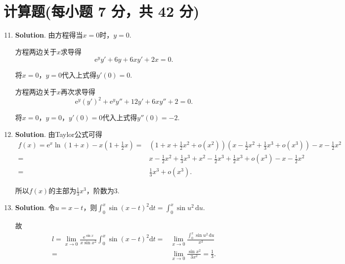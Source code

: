 \documentclass[../Main.tex]{subfiles}
\begin{document}
\section{计算题(每小题 7 分，共 42 分)}
\begin{enumerate}
    \setcounter{enumi}{10}
    \item \textbf{Solution}. 由方程得当$x=0$时，$y=0$.

          方程两边关于$x$求导得
          \[
              \mathrm{e}^{y}y'+6y+6xy'+2x=0.
          \]

          将$x=0$，$y=0$代入上式得$y'(0)=0$.

          方程两边关于$x$再次求导得
          \[
              \mathrm{e}^{y}(y')^{2}+\mathrm{e}^{y}y''+12y'+6xy''+2=0.
          \]

          将$x=0$，$y=0$，$y'(0)=0$代入上式得$y''(0)=-2$.

    \item \textbf{Solution}. 由Taylor公式可得
          \[
              \begin{aligned}
                  f(x)=\mathrm{e}^{x}\ln(1+x)-x\left(1+\frac{1}{2}x\right) = & \left(1+x+\frac{1}{2}x^{2}+o(x^{2})\right)\left(x-\frac{1}{2}x^{2}+\frac{1}{3}x^{3}+o(x^{3})\right)-x-\frac{1}{2}x^{2} \\
                  =                                                          & x-\frac{1}{2}x^{2}+\frac{1}{3}x^{3}+x^{2}-\frac{1}{2}x^{3}+\frac{1}{2}x^{3}+o(x^{3})-x-\frac{1}{2}x^{2}                \\
                  =                                                          & \frac{1}{3}x^{3}+o(x^{3}).
              \end{aligned}
          \]

          所以$f(x)$的主部为$\frac{1}{3}x^{3}$，阶数为$3$.

    \item \textbf{Solution}. 令$u=x-t$，则$\int_{0}^{x}\sin(x-t)^{2} \mathrm{d}
              t = \int_{0}^{x}\sin u^{2}\,\mathrm{d}u$.

          故
          \[
              \begin{aligned}
                  l = \lim_{x\to0}\frac{\mathrm{e}^{\sin x}}{x\sin x^2}\int_{0}^{x}\sin(x-t)^{2} \mathrm{d}t = & \lim_{x\to0}\frac{\displaystyle\int_{0}^{x}\sin u^2\,\mathrm{d}u}{x^3} \\
                  =                                                                                            & \lim_{x\to0}\frac{\sin x^2}{3x^2}= \frac{1}{3}.
              \end{aligned}
          \]


\end{enumerate}
\end{document}
